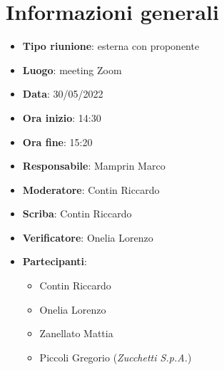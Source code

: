 \section{Informazioni generali}
\begin{itemize}
  \item \textbf{Tipo riunione}: esterna con proponente
  \item \textbf{Luogo}: meeting Zoom
  \item \textbf{Data}: 30/05/2022
  \item \textbf{Ora inizio}: 14:30
  \item \textbf{Ora fine}: 15:20
  \item \textbf{Responsabile}: Mamprin Marco
  \item \textbf{Moderatore}: Contin Riccardo
  \item \textbf{Scriba}: Contin Riccardo
  \item \textbf{Verificatore}: Onelia Lorenzo
  \item \textbf{Partecipanti}:
  \begin{itemize}
    \item Contin Riccardo
    \item Onelia Lorenzo
    \item Zanellato Mattia
    \item Piccoli Gregorio (\textit{Zucchetti S.p.A.})
  \end{itemize}
\end{itemize}
